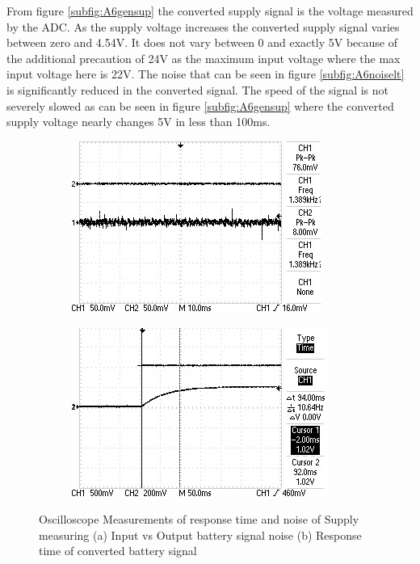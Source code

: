 From figure \ref{subfig:A6gensup} the converted supply signal is the voltage measured by the ADC. As the supply voltage increases the converted supply signal varies between zero and 4.54V. It does not vary between 0 and exactly 5V because of the additional precaution of 24V as the maximum input voltage where the max input voltage here is 22V. The noise that can be seen in figure  \ref{subfig:A6noiselt} is significantly reduced in the converted signal. The speed of the signal is not severely slowed as can be seen in figure  \ref{subfig:A6gensup} where the converted supply voltage nearly changes 5V in less than 100ms. 




\begin{figure}[!htb]
	\footnotesize
	\centering
	\begin{subfigure}[]{0.4\textwidth}
		\centering
		\includegraphics[width=1\linewidth]{./Figures/A6/noisesup.jpg}
		\caption{} \label{subfig:noiseSup}
	\end{subfigure}
	\begin{subfigure}[]{0.4\textwidth}
		\centering
		\includegraphics[width=1\linewidth]{./Figures/A6/risesup.jpg}
		\caption{ } \label{subfig:resSup}
	\end{subfigure}
	\caption[{Oscilloscope Measurements of response time and noise of Supply measuring}]{Oscilloscope Measurements of response time and noise of Supply measuring  (a) Input vs Output battery signal noise (b) Response time of converted battery signal }
	\label{fig:A6suposc}
\end{figure}
